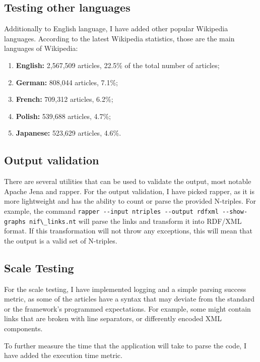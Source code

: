 \documentclass[thesis=M,english,hidelinks]{FITthesis}[2019/12/23]
\begin{document}
\subsection{Testing other languages}

Additionally to English language, I have added other popular Wikipedia languages. According to the latest Wikipedia statistics, those are the main languages of Wikipedia\cite{top_ten_wikis}:

\begin{enumerate}
	\item \textbf{English:} 2,567,509 articles, 22.5\% of the total number of articles;
	\item \textbf{German:} 808,044 articles, 7.1\%;
	\item \textbf{French:} 709,312 articles, 6.2\%;
	\item \textbf{Polish:} 539,688 articles, 4.7\%;
	\item \textbf{Japanese:} 523,629 articles, 4.6\%.
\end{enumerate}


\subsection{Output validation}

There are several utilities that can be used to validate the output, most notable Apache Jena and rapper\cite{rapper_utility}. For the output validation, I have picked rapper, as it is more lightweight and has the ability to count or parse the provided N-triples. For example, the command \lstinline{rapper --input ntriples --output rdfxml --show-graphs nif\_links.nt} will parse the links and transform it into RDF/XML format. If this transformation will not throw any exceptions, this will mean that the output is a valid set of N-triples.

\subsection{Scale Testing}

For the scale testing, I have implemented logging and a simple parsing success metric, as some of the articles have a syntax that may deviate from the standard or the framework's programmed expectations. For example, some might contain links that are broken with line separators, or differently encoded XML components. 

To further measure the time that the application will take to parse the code, I have added the execution time metric.
\end{document}
